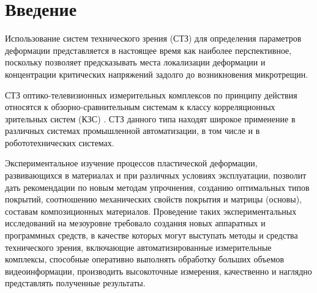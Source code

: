 \setcounter{figure}{0}
\newpage
\section{Введение}



Использование систем технического зрения (СТЗ) для определения параметров деформации представляется в настоящее время как наиболее перспективное, поскольку позволяет предсказывать места локализации деформации и концентрации критических напряжений задолго до возникновения микротрещин.

СТЗ оптико-телевизионных измерительных комплексов по принципу действия относятся к обзорно-сравнительным системам к классу корреляционных зрительных систем (КЗС) \cite{korrel_robot}. СТЗ данного типа находят широкое применение в различных системах промышленной автоматизации, в том числе и в робототехнических системах.


Экспериментальное изучение процессов пластической деформации, развивающихся в материалах и при различных условиях эксплуатации, позволит дать рекомендации по новым методам упрочнения, созданию оптимальных типов покрытий, соотношению механических свойств покрытия и матрицы (основы), составам композиционных материалов. Проведение таких экспериментальных исследований на мезоуровне требовало создания новых аппаратных и программных средств, в качестве которых могут выступать методы и средства технического зрения, включающие автоматизированные измерительные комплексы, способные оперативно выполнять обработку больших объемов видеоинформации, производить высокоточные измерения, качественно и наглядно представлять полученные результаты.

